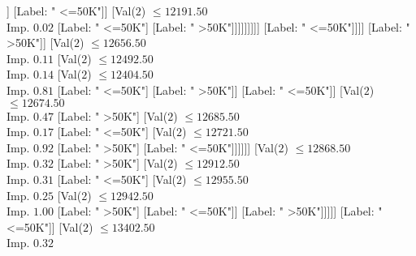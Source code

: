 \documentclass[margin=10pt]{standalone}
\begin{document}
\begin{forest}
																														[Label: " <=50K"]
																														[Val($2$) $ \leq 11992.50$ \\ Imp. $0.09$
																															[Label: " >50K"]
																															[Val($2$) $ \leq 12138.50$ \\ Imp. $0.07$
																																[Val($2$) $ \leq 12051.50$ \\ Imp. $0.29$
																																	[Val($2$) $ \leq 11998.50$ \\ Imp. $0.31$
																																		[Label: " <=50K"]
																																		[Label: " >50K"]]
																																	[Label: " <=50K"]]
																																[Val($2$) $ \leq 12191.50$ \\ Imp. $0.02$
																																	[Label: " <=50K"]
																																	[Label: " >50K"]]]]]]]]]
																									[Label: " <=50K"]]]]
																						[Label: " >50K"]]
																					[Val($2$) $ \leq 12656.50$ \\ Imp. $0.11$
																						[Val($2$) $ \leq 12492.50$ \\ Imp. $0.14$
																							[Val($2$) $ \leq 12404.50$ \\ Imp. $0.81$
																								[Label: " <=50K"]
																								[Label: " >50K"]]
																							[Label: " <=50K"]]
																						[Val($2$) $ \leq 12674.50$ \\ Imp. $0.47$
																							[Label: " >50K"]
																							[Val($2$) $ \leq 12685.50$ \\ Imp. $0.17$
																								[Label: " <=50K"]
																								[Val($2$) $ \leq 12721.50$ \\ Imp. $0.92$
																									[Label: " >50K"]
																									[Label: " <=50K"]]]]]]
																				[Val($2$) $ \leq 12868.50$ \\ Imp. $0.32$
																					[Label: " >50K"]
																					[Val($2$) $ \leq 12912.50$ \\ Imp. $0.31$
																						[Label: " <=50K"]
																						[Val($2$) $ \leq 12955.50$ \\ Imp. $0.25$
																							[Val($2$) $ \leq 12942.50$ \\ Imp. $1.00$
																								[Label: " >50K"]
																								[Label: " <=50K"]]
																							[Label: " >50K"]]]]]
																			[Label: " <=50K"]]
																		[Val($2$) $ \leq 13402.50$ \\ Imp. $0.32$

\end{forest}
\end{document}
